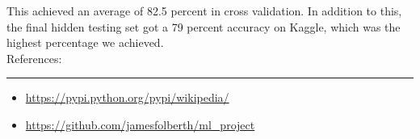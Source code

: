 \documentclass{article}
\newcommand{\problemline}{\rule{\textwidth}{0.25mm}}
\theoremstyle{mystuff}
\theoremstyle{myexample}
\theoremstyle{named}
\begin{document}
This achieved an average of 82.5 percent in cross validation.  In addition to this, the final hidden testing set got a 79 percent accuracy on Kaggle, which was the highest percentage we achieved. \\



References:\\
\problemline
\begin{itemize}
   \item \url{https://pypi.python.org/pypi/wikipedia/}
   \item \url{https://github.com/jamesfolberth/ml_project}
\end{itemize}

%
%
\end{document}
